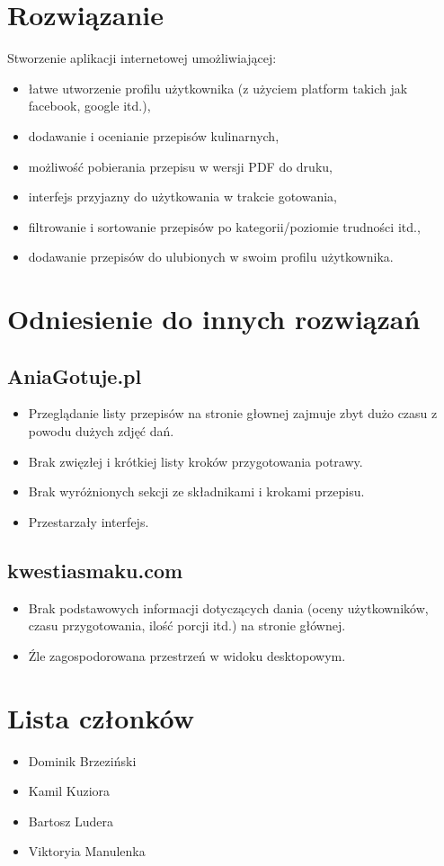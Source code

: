 \documentclass{article}
\begin{document}
\section{Rozwiązanie}
Stworzenie aplikacji internetowej umożliwiającej:
\begin{itemize}
    \item łatwe utworzenie profilu użytkownika (z użyciem platform takich jak facebook, google itd.),
    \item dodawanie i ocenianie przepisów kulinarnych,
    \item możliwość pobierania przepisu w wersji PDF do druku,
    \item interfejs przyjazny do użytkowania w trakcie gotowania,
    \item filtrowanie i sortowanie przepisów po kategorii/poziomie trudności itd.,
    \item dodawanie przepisów do ulubionych w swoim profilu użytkownika.
\end{itemize}

\section{Odniesienie do innych rozwiązań}
\subsection{AniaGotuje.pl}
\begin{itemize}
    \item Przeglądanie listy przepisów na stronie głownej zajmuje zbyt dużo czasu z powodu dużych zdjęć dań.
    \item Brak zwięzłej i krótkiej listy kroków przygotowania potrawy.
    \item Brak wyróżnionych sekcji ze składnikami i krokami przepisu.
    \item Przestarzały interfejs.
\end{itemize}
\subsection{kwestiasmaku.com}
\begin{itemize}
    \item Brak podstawowych informacji dotyczących dania (oceny użytkowników, czasu przygotowania, ilość porcji itd.) na stronie głównej.
    \item Źle zagospodorowana przestrzeń w widoku desktopowym.
\end{itemize}
\section{Lista członków}
\begin{itemize}
    \item Dominik Brzeziński
    \item Kamil Kuziora
    \item Bartosz Ludera
    \item Viktoryia Manulenka
\end{itemize}
\end{document}
